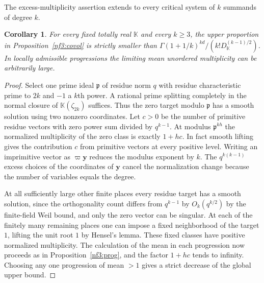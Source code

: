 \documentclass[11pt,letterpaper]{article}
\newtheorem{corollary}[corollary]{Corollary}
\theoremstyle{definition}
\numberwithin{equation}{section}
\begin{document}
The excess-multiplicity assertion extends to every critical system of
$k$ summands of degree $k$.
\begin{corollary}\label{nf3:critical}
For every fixed totally real $\mathbb K$ and every $k\ge3$, the upper
proportion in Proposition~\ref{nf3:covol} is strictly smaller than
$\Gamma(1+1/k)^{kd}/(k!D_{\mathbb K}^{(k-1)/2})$. In locally admissible
progressions the limiting mean unordered multiplicity can be arbitrarily
large.
\end{corollary}
\begin{proof}
Select one prime ideal $\mathfrak p$ of residue norm $q$ with
residue characteristic prime to $2k$ and $-1$ a $k$th power. A rational
prime splitting completely in the normal closure of
$\mathbb K(\zeta_{2k})$ suffices. Thus the zero target modulo
$\mathfrak p$ has a smooth solution using two nonzero coordinates.
Let $c>0$ be the number of primitive residue vectors with zero power sum
divided by $q^{k-1}$. At modulus $\mathfrak p^{kh}$ the normalized
multiplicity of the zero class is exactly $1+hc$. In fact smooth
lifting gives the contribution $c$ from primitive vectors at every
positive level. Writing an imprimitive vector as $\varpi\mathbf y$
reduces the modulus exponent by $k$. The $q^{k(k-1)}$ excess choices
of the coordinates of $\mathbf y$ cancel the normalization change
because the number of variables equals the degree.

At all sufficiently large other finite places every residue target
has a smooth solution, since the orthogonality count differs from
$q^{k-1}$ by $O_k(q^{k/2})$ by the finite-field Weil bound, and only
the zero vector can be singular. At each of the finitely many remaining
places one can impose a fixed neighborhood of the target $1$, lifting
the unit root $1$ by Hensel's lemma. These fixed classes have positive
normalized multiplicity. The calculation of the mean in each
progression now proceeds as in Proposition~\ref{nf3:prog}, and the factor
$1+hc$ tends to infinity. Choosing any one progression of mean $>1$
gives a strict decrease of the global upper bound.
\end{proof}
\end{document}
